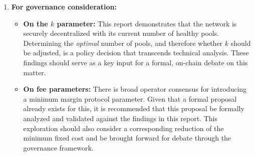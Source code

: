 \documentclass[11pt, letterpaper]{article}
\begin{document}
\begin{enumerate}
	\item \textbf{For governance consideration:}
	      \begin{itemize}
		      \item \textbf{On the $k$ parameter:} This report demonstrates that the network is securely decentralized
		            with its current number of healthy pools. Determining the \textit{optimal} number of pools, and therefore
		            whether $k$ should be adjusted, is a policy decision that transcends technical analysis. These findings
		            should serve as a key input for a formal, on-chain debate on this matter.
		      \item \textbf{On fee parameters:} There is broad operator consensus for introducing a minimum margin
		            protocol parameter. Given that a formal proposal already exists for this, it is recommended that this
		            proposal be formally analyzed and validated against the findings in this report. This exploration should
		            also consider a corresponding reduction of the minimum fixed cost and be brought forward for debate
		            through the governance framework.
	      \end{itemize}


\end{enumerate}
\end{document}
